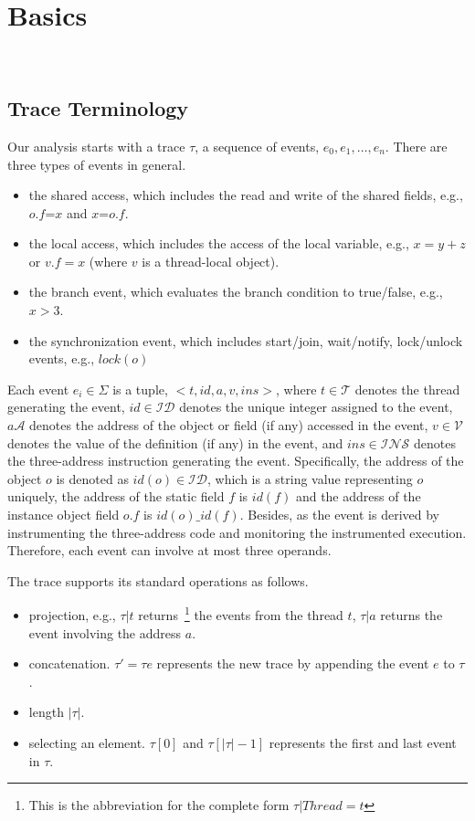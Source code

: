 \section{Basics}~\label{sec:basic}


\subsection{Trace Terminology}
Our analysis starts with a trace $\tau$,  a sequence of events, $e_0, e_1, \dots, e_n$.  
There are three types of events in general.
\begin{itemize}
\item the shared access, which includes the read and write of the shared fields, e.g., $o.f$=$x$ and $x$=$o.f$.
\item the local access, which includes the access of the local variable, e.g., $x=y+z$ or $v.f=x$ (where $v$ is a thread-local object).
\item the branch event, which evaluates the branch condition to true/false, e.g., $x>3$.
\item the synchronization event, which includes start/join, wait/notify, lock/unlock events, e.g., $lock(o)$
\end{itemize}



Each event $e_i \in \Sigma$ is a tuple, $<t, id, a, v, ins>$, where $t\in \mathcal{T}$ denotes the thread generating the event, $id\in \mathcal{ID}$ denotes the unique integer assigned to the event, $a\mathcal{A}$ denotes the address of the object or field (if any) accessed in the event,  $v\in \mathcal{V}$ denotes the value of the definition (if any) in the event, and $ins\in \mathcal{INS}$ denotes the three-address instruction generating the event.  Specifically, the address of the object $o$ is denoted as $id(o)\in \mathcal{ID}$, which is a string value representing $o$ uniquely, the address of the static field $f$ is  $id(f)$ and the address of the instance object field $o.f$ is  $id(o)\_id(f)$. Besides, as the event is derived by instrumenting the three-address code and monitoring the instrumented execution. Therefore, each event can involve at most three operands. 


The trace supports its standard operations as follows.
\begin{itemize}
\item projection, e.g., $\tau|t$ returns~\footnote{This is the abbreviation for the complete form $\tau|Thread=t$ } the events from the thread $t$,  $\tau|a$ returns the event involving the address $a$.  
\item concatenation. $\tau'=\tau e$ represents the new trace by appending the event $e$ to $\tau$.
\item length $|\tau|$. 
\item selecting an element. $\tau[0]$ and $\tau[|\tau|-1]$ represents the first and last event in $\tau$.
\end{itemize}


